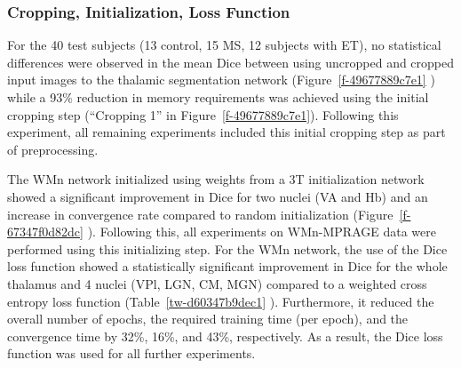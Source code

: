 \subsubsection{Cropping, Initialization, Loss Function }For the 40 test subjects (13 control, 15 MS, 12 subjects with ET), no statistical differences were observed in the mean Dice between using uncropped and cropped input images to the thalamic segmentation network (Figure~\ref{f-49677889c7e1} ) while a 93\% reduction in memory requirements was achieved using the initial cropping step (``Cropping 1'' in Figure~\ref{f-49677889c7e1}). Following this experiment, all remaining experiments included this initial cropping step as part of preprocessing. 

The WMn network initialized using weights from a 3T initialization network showed a significant improvement in Dice for two nuclei (VA and Hb) and an increase in convergence rate compared to random initialization (Figure~\ref{f-67347f0d82dc} ). Following this, all experiments on WMn-MPRAGE data were performed using this initializing step. For the WMn network, the use of the Dice loss function showed a statistically significant improvement in Dice for the whole thalamus and 4 nuclei (VPl, LGN, CM, MGN) compared to a weighted cross entropy loss function (Table~\ref{tw-d60347b9dec1} ). Furthermore, it reduced the overall number of epochs, the required training time (per epoch), and the convergence time by 32\%, 16\%, and 43\%, respectively. As a result, the Dice loss function was used for all further experiments. 


